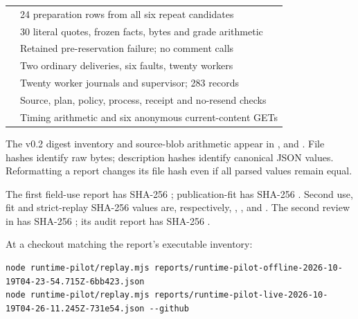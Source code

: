 \documentclass[11pt,letterpaper]{article}
\begin{document}
\begin{longtable}{@{}L{.64\linewidth}L{.30\linewidth}@{}}
 & 24 preparation rows from all six repeat candidates \\
 & 30 literal quotes, frozen facts, bytes and grade arithmetic \\
 & Retained pre-reservation failure; no comment calls \\
 & Two ordinary deliveries, six faults, twenty workers \\
 & Twenty worker journals and supervisor; 283 records \\
 & Source, plan, policy, process, receipt and no-resend checks \\
 & Timing arithmetic and six anonymous current-content GETs \\
\bottomrule
\end{longtable}

The v0.2 digest inventory and source-blob arithmetic appear in
,  and
. File hashes identify raw bytes; description hashes identify
canonical JSON values. Reformatting a report changes its file hash even if
all parsed values remain equal.

The first field-use report has SHA-256
;
publication-fit has SHA-256
.
Second use, fit and strict-replay SHA-256 values are, respectively,
,
,
and .
The second review in  has SHA-256
;
its audit report has SHA-256
.

At a checkout matching the report's executable inventory:
\begin{lstlisting}
node runtime-pilot/replay.mjs reports/runtime-pilot-offline-2026-10-19T04-23-54.715Z-6bb423.json
node runtime-pilot/replay.mjs reports/runtime-pilot-live-2026-10-19T04-26-11.245Z-731e54.json --github
\end{lstlisting}
\end{document}
